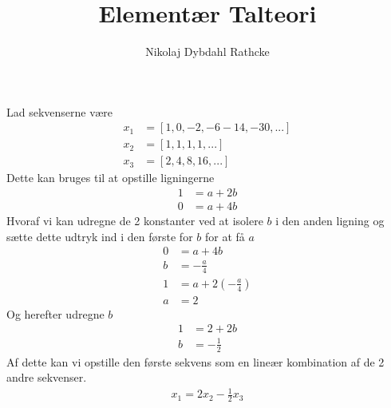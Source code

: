 \documentclass[12pt]{article}
\title{Elementær Talteori}
\author{Nikolaj Dybdahl Rathcke}
\begin{document}
Lad sekvenserne være
\begin{align*}
x_1&=[1,0,-2,-6-14,-30,...] \\
x_2&=[1,1,1,1,...] \\
x_3&=[2,4,8,16,...]
\end{align*}
Dette kan bruges til at opstille ligningerne
\begin{align*}
1&=a+2b \\
0&=a+4b
\end{align*}
Hvoraf vi kan udregne de 2 konstanter ved at isolere $b$ i den anden ligning og sætte dette udtryk ind i den første for $b$ for at få $a$
\begin{align*}
0&=a+4b \\
b&=-\frac{a}{4} \\
1&=a+2(-\frac{a}{4}) \\
a&=2
\end{align*}
Og herefter udregne $b$
\begin{align*}
1&=2+2b \\
b&=-\frac{1}{2}
\end{align*}
Af dette kan vi opstille den første sekvens som en lineær kombination af de 2 andre sekvenser.
\begin{align*}
x_1=2x_{2}-\frac{1}{2}x_{3}
\end{align*}
\end{document}
